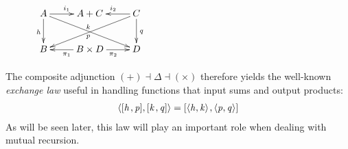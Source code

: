 \documentclass{elsarticle}
\newcommand{\Varid}[1]{\mathit{#1}}
\def\alt#1#2{\mathopen{[}#1\hskip 1pt,#2\mathclose{]}}
\def\p#1{\pi_{#1}}
\def\conj#1#2{\mathopen{\langle} #1, #2 \mathclose{\rangle}}
\begin{document}
\begin{wrapfigure}[8]{l}{12.5em}
\(
\xymatrix{
	A
		\ar[r]^{i_1}
		\ar[d]_{\ensuremath{\Varid{h}}}
		\ar[drr]_{\ensuremath{\Varid{p}}}
&
	A+C
&
	C
		\ar[dll]_{\ensuremath{\Varid{k}}}
		\ar[d]^{\ensuremath{\Varid{q}}}
		\ar[l]_{i_2}
\\
	B
&
	B\times D
		\ar[l]^{\p1}
		\ar[r]_{\p2}
&
	D
}
\)
\end{wrapfigure}
The composite adjunction \ensuremath{(\mathbin{+})\mathbin\dashv \Delta \mathbin\dashv ( \times )} therefore yields the
well-known \emph{exchange law} useful in handling functions that input
sums and output products:
\begin{eqnarray}
	\ensuremath{\conj{\alt{\Varid{h}}{\Varid{p}}}{\alt{\Varid{k}}{\Varid{q}}}\mathrel{=}\alt{\conj{\Varid{h}}{\Varid{k}}}{\conj{\Varid{p}}{\Varid{q}}}}
	\label{eq:exLaw}
\end{eqnarray}
As will be seen later, this law will play an important role when dealing with mutual recursion.
\end{document}
